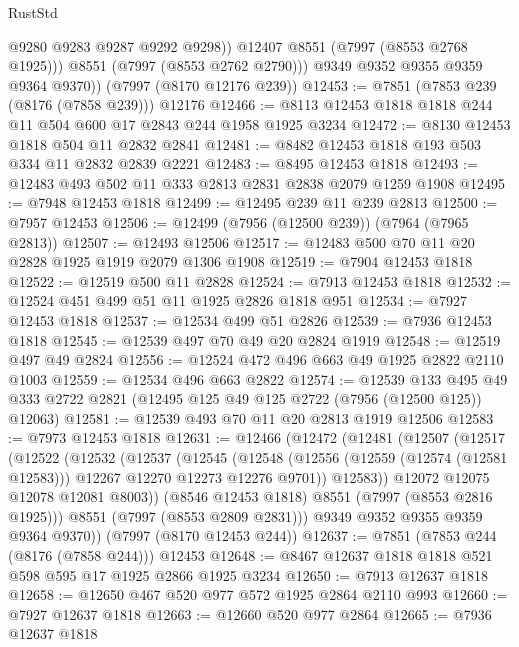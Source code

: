 \begin{lexlean}{RustStd}
\begin{coremodule}
                @9280
                @9283
                @9287
                @9292
                @9298))
            @12407
            @8551
            (@7997 (@8553 @2768 @1925)))
          @8551
          (@7997 (@8553 @2762 @2790)))
        @9349
        @9352
        @9355
        @9359
        @9364
        @9370))
    (@7997 (@8170 @12176 @239))
@12453 := @7851 (@7853 @239 (@8176 (@7858 @239))) @12176
@12466 := @8113 @12453 @1818 @1818 @244 @11 @504 @600 @17 @2843 @244 @1958 @1925 @3234
@12472 := @8130 @12453 @1818 @504 @11 @2832 @2841
@12481 := @8482 @12453 @1818 @193 @503 @334 @11 @2832 @2839 @2221
@12483 := @8495 @12453 @1818
@12493 := @12483 @493 @502 @11 @333 @2813 @2831 @2838 @2079 @1259 @1908
@12495 := @7948 @12453 @1818
@12499 := @12495 @239 @11 @239 @2813
@12500 := @7957 @12453
@12506 := @12499 (@7956 (@12500 @239)) (@7964 (@7965 @2813))
@12507 := @12493 @12506
@12517 := @12483 @500 @70 @11 @20 @2828 @1925 @1919 @2079 @1306 @1908
@12519 := @7904 @12453 @1818
@12522 := @12519 @500 @11 @2828
@12524 := @7913 @12453 @1818
@12532 := @12524 @451 @499 @51 @11 @1925 @2826 @1818 @951
@12534 := @7927 @12453 @1818
@12537 := @12534 @499 @51 @2826
@12539 := @7936 @12453 @1818
@12545 := @12539 @497 @70 @49 @20 @2824 @1919
@12548 := @12519 @497 @49 @2824
@12556 := @12524 @472 @496 @663 @49 @1925 @2822 @2110 @1003
@12559 := @12534 @496 @663 @2822
@12574 := @12539
    @133
    @495
    @49
    @333
    @2722
    @2821
    (@12495 @125 @49 @125 @2722 (@7956 (@12500 @125)) @12063)
@12581 := @12539 @493 @70 @11 @20 @2813 @1919 @12506
@12583 := @7973 @12453 @1818
@12631 := @12466
    (@12472
      (@12481
        (@12507
          (@12517
            (@12522
              (@12532
                (@12537
                  (@12545
                    (@12548
                      (@12556 (@12559 (@12574 (@12581 @12583))) @12267 @12270 @12273 @12276 @9701))
                    @12583))
                @12072
                @12075
                @12078
                @12081
                @8003))
            (@8546 @12453 @1818)
            @8551
            (@7997 (@8553 @2816 @1925)))
          @8551
          (@7997 (@8553 @2809 @2831)))
        @9349
        @9352
        @9355
        @9359
        @9364
        @9370))
    (@7997 (@8170 @12453 @244))
@12637 := @7851 (@7853 @244 (@8176 (@7858 @244))) @12453
@12648 := @8467 @12637 @1818 @1818 @521 @598 @595 @17 @1925 @2866 @1925 @3234
@12650 := @7913 @12637 @1818
@12658 := @12650 @467 @520 @977 @572 @1925 @2864 @2110 @993
@12660 := @7927 @12637 @1818
@12663 := @12660 @520 @977 @2864
@12665 := @7936 @12637 @1818

\end{coremodule}
\end{lexlean}
